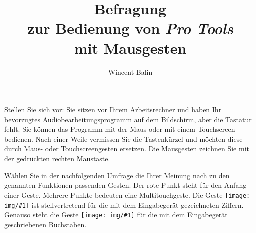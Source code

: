\documentclass[11pt,a4paper,notitlepage]{article}
\author{Wincent Balin}
\title{Befragung\\zur Bedienung von \emph{Pro Tools}\\mit Mausgesten}
\begin{document}
\maketitle

%
%

\newcommand{\quarterpic}[1][]{\texttt{[image: img/\#1]}}

Stellen Sie sich vor: Sie sitzen vor Ihrem Arbeitsrechner und haben Ihr bevorzugtes Audiobearbeitungsprogramm
auf dem Bildschirm, aber die Tastatur fehlt. Sie können das Programm mit der Maus oder mit einem Touchscreen bedienen.
Nach einer Weile vermissen Sie die Tastenkürzel und möchten diese durch Maus- oder Touchscreengesten ersetzen.
Die Mausgesten zeichnen Sie mit der gedrückten rechten Maustaste.

Wählen Sie in der nachfolgenden Umfrage die Ihrer Meinung nach zu den genannten Funktionen passenden Gesten.
Der rote Punkt steht für den Anfang einer Geste. Mehrere Punkte bedeuten eine Multitouchgeste.
Die Geste \quarterpic[digit-1] ist stellvertretend für die mit dem Eingabegerät gezeichneten Ziffern. Genauso steht
die Geste \quarterpic[letter-a] für die mit dem Eingabegerät geschriebenen Buchstaben.

\newcommand{\rownumber}{\addtocounter{rownum}{1}\arabic{rownum}}
\setcounter{rownum}{0}

\tablelasttail{\bottomrule}
\end{document}
